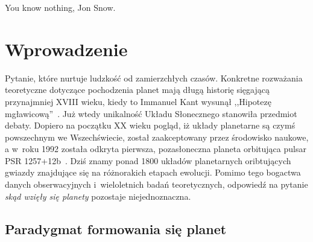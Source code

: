 \begin{savequote}[75mm]
   You know nothing, Jon Snow.
\end{savequote}

\chapter{Wprowadzenie}
 Pytanie, które nurtuje ludzkość od
zamierzchłych czasów. Konkretne rozważania teoretyczne dotyczące pochodzenia
planet mają długą historię sięgającą przynajmniej XVIII wieku, kiedy to Immanuel
Kant wysunął ,,Hipotezę mgławicową''~\cite{ImmanuelKant.etal:2008}. Już wtedy
unikalność Układu Słonecznego stanowiła przedmiot debaty. Dopiero na początku XX
wieku pogląd, iż układy planetarne są czymś powszechnym we Wszechświecie, został
zaakceptowany przez środowisko naukowe, a w~roku 1992 została odkryta pierwsza,
pozasłoneczna planeta orbitująca pulsar PSR 1257+12b~\cite{1992Natur.355..145W}.
Dziś znamy ponad 1800 układów planetarnych oribtujących gwiazdy znajdujące się
na różnorakich etapach ewolucji. Pomimo tego bogactwa danych obserwacyjnych
i~wieloletnich badań teoretycznych, odpowiedź na pytanie \emph{skąd wzięły się
planety} pozostaje niejednoznaczna.


\section{Paradygmat formowania się planet}
